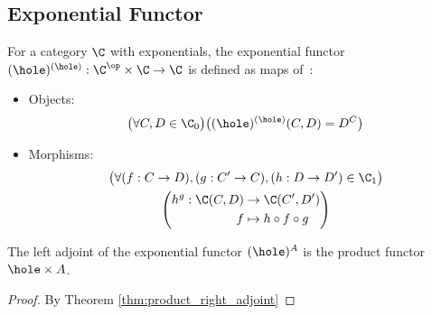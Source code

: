 \subsection{Exponential Functor}
\begin{definition}
  For a category $\C$ with exponentials, the exponential functor
  $(\hole)^{(\hole)}:\C^\op\times \C \to \C$ is defined as
  maps of~\parencite[p.~44]{lane:working_mathematician}:

  \begin{itemize}
    \item Objects:
      \[\big(\forall C, D \in \C_0\big)
        \big((\hole)^{(\hole)}(C, D) = D^C\big)\]
    \item Morphisms:
      \[
        \begin{gathered}
          \big(\forall (f: C\to D),(g: C' \to C), (h: D\to D') \in \C_1\big)\\
          \left(
            \begin{aligned}
              h^g : \C(C, D) &\to \C(C', D')\\
              f&\mapsto h\circ f\circ g
            \end{aligned}
          \right)
        \end{gathered}
      \]
  \end{itemize}
\end{definition}

\begin{theorem}
  The left adjoint of the exponential functor $(\hole)^A$ is the product functor
  $\hole\times A$.

  \begin{proof}
    By Theorem \ref{thm:product_right_adjoint}
  \end{proof}
\end{theorem}

